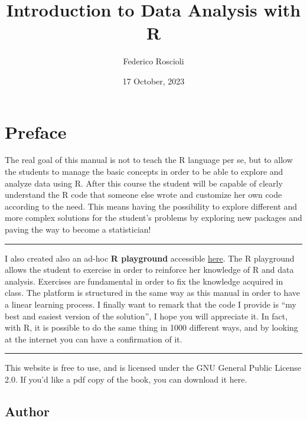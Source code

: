 \documentclass[
]{svmono}
\title{Introduction to Data Analysis with R}
\author{Federico Roscioli}
\date{17 October, 2023}
\begin{document}
\maketitle

{
\hypersetup{linkcolor=}
\setcounter{tocdepth}{2}
\tableofcontents
}
\hypertarget{preface}{%
\chapter*{Preface}\label{preface}}

The real goal of this manual is not to teach the R language per se, but
to allow the students to manage the basic concepts in order to be able
to explore and analyze data using R. After this course the student will
be capable of clearly understand the R code that someone else wrote and
customize her own code according to the need. This means having the
possibility to explore different and more complex solutions for the
student's problems by exploring new packages and paving the way to
become a statistician!

\begin{center}\rule{0.5\linewidth}{0.5pt}\end{center}

I also created also an ad-hoc \textbf{R playground} accessible
\href{https://federicoroscioli.shinyapps.io/exercises/}{here}. The R
playground allows the student to exercise in order to reinforce her
knowledge of R and data analysis. Exercises are fundamental in order to
fix the knowledge acquired in class. The platform is structured in the
same way as this manual in order to have a linear learning process. I
finally want to remark that the code I provide is ``my best and easiest
version of the solution'', I hope you will appreciate it. In fact, with
R, it is possible to do the same thing in 1000 different ways, and by
looking at the internet you can have a confirmation of it.

\begin{center}\rule{0.5\linewidth}{0.5pt}\end{center}

This website is free to use, and is licensed under the GNU General Public
License 2.0. If you'd like a pdf copy of the book, you can download it here.

\hypertarget{author}{%
\section*{Author}\label{author}}
\end{document}
